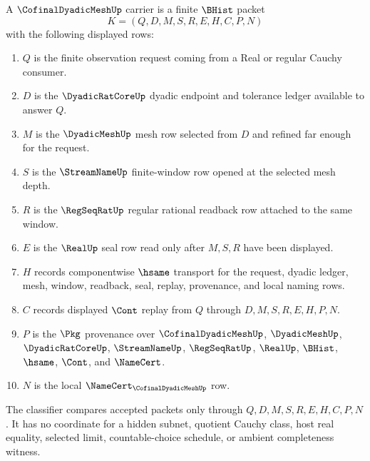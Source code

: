 \begin{definition}
\label{def:cofinal-dyadic-mesh-carrier}
A $\CofinalDyadicMeshUp$ carrier is a finite $\BHist$ packet
$$
K=(Q,D,M,S,R,E,H,C,P,N)
$$
with the following displayed rows:
\begin{enumerate}
\item $Q$ is the finite observation request coming from a Real or regular Cauchy consumer.
\item $D$ is the $\DyadicRatCoreUp$ dyadic endpoint and tolerance ledger available to answer $Q$.
\item $M$ is the $\DyadicMeshUp$ mesh row selected from $D$ and refined far enough for the request.
\item $S$ is the $\StreamNameUp$ finite-window row opened at the selected mesh depth.
\item $R$ is the $\RegSeqRatUp$ regular rational readback row attached to the same window.
\item $E$ is the $\RealUp$ seal row read only after $M,S,R$ have been displayed.
\item $H$ records componentwise $\hsame$ transport for the request, dyadic ledger, mesh, window, readback, seal, replay, provenance, and local naming rows.
\item $C$ records displayed $\Cont$ replay from $Q$ through $D,M,S,R,E,H,P,N$.
\item $P$ is the $\Pkg$ provenance over $\CofinalDyadicMeshUp$, $\DyadicMeshUp$, $\DyadicRatCoreUp$, $\StreamNameUp$, $\RegSeqRatUp$, $\RealUp$, $\BHist$, $\hsame$, $\Cont$, and $\NameCert$.
\item $N$ is the local $\NameCert_{\CofinalDyadicMeshUp}$ row.
\end{enumerate}
The classifier compares accepted packets only through $Q,D,M,S,R,E,H,C,P,N$. It has no coordinate for a hidden subnet, quotient Cauchy class, host real equality, selected limit, countable-choice schedule, or ambient completeness witness.
\end{definition}

